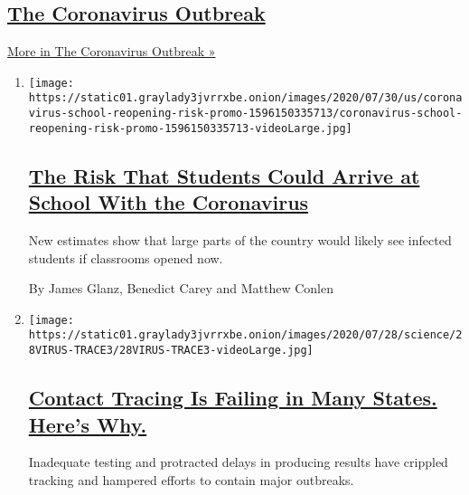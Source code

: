 \hypertarget{the-coronavirus-outbreak}{%
\subsection{\texorpdfstring{\href{/news-event/coronavirus}{The
Coronavirus
Outbreak}}{The Coronavirus Outbreak}}\label{the-coronavirus-outbreak}}

\href{/news-event/coronavirus}{More in The Coronavirus Outbreak »}

\begin{enumerate}
\def\labelenumi{\arabic{enumi}.}
\item
  \texttt{[image: https://static01.graylady3jvrrxbe.onion/images/2020/07/30/us/coronavirus-school-reopening-risk-promo-1596150335713/coronavirus-school-reopening-risk-promo-1596150335713-videoLarge.jpg]}

  \hypertarget{the-risk-that-students-could-arrive-at-school-with-the-coronavirus}{%
  \subsection{\texorpdfstring{\href{/interactive/2020/07/31/us/coronavirus-school-reopening-risk.html}{The
  Risk That Students Could Arrive at School With the
  Coronavirus}}{The Risk That Students Could Arrive at School With the Coronavirus}}\label{the-risk-that-students-could-arrive-at-school-with-the-coronavirus}}

  New estimates show that large parts of the country would likely see
  infected students if classrooms opened now.

  By James Glanz, Benedict Carey and Matthew Conlen
\item
  \texttt{[image: https://static01.graylady3jvrrxbe.onion/images/2020/07/28/science/28VIRUS-TRACE3/28VIRUS-TRACE3-videoLarge.jpg]}

  \hypertarget{contact-tracing-is-failing-in-many-states-heres-why}{%
  \subsection{\texorpdfstring{\href{/2020/07/31/health/covid-contact-tracing-tests.html}{Contact
  Tracing Is Failing in Many States. Here's
  Why.}}{Contact Tracing Is Failing in Many States. Here's Why.}}\label{contact-tracing-is-failing-in-many-states-heres-why}}

  Inadequate testing and protracted delays in producing results have
  crippled tracking and hampered efforts to contain major outbreaks.


\end{enumerate}
